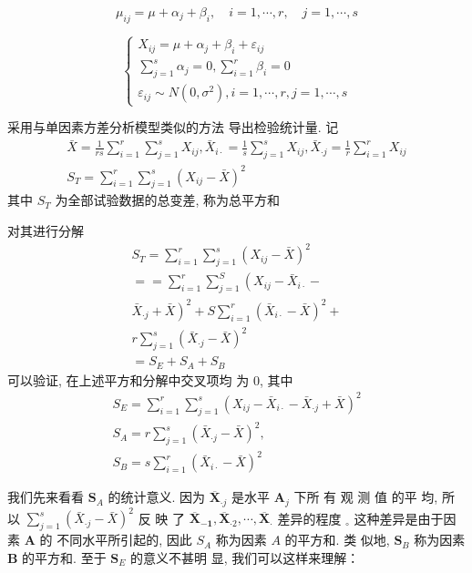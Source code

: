 $$
\mu_{i j}=\mu+\alpha_{j}+\beta_{i}, \quad i=1, \cdots, r, \quad j=1, \cdots, s
$$

$$ \left\{\begin{array}{l}X_{i j}=\mu+\alpha_{j}+\beta_{i}+\varepsilon_{i j} \\ \sum_{j=1}^{s} \alpha_{j}=0, \sum_{i=1}^{r} \beta_{i}=0 \\ \varepsilon_{i j} \sim N\left(0, \sigma^{2}\right), i=1, \cdots, r, j=1, \cdots, s\end{array}\right. $$

采用与单因素方差分析模型类似的方法 导出检验统计量. 
记
$$
\begin{array}{c}
\bar{X}=\frac{1}{r s} \sum_{i=1}^{r} \sum_{j=1}^{s} X_{i j}, \bar{X}_{i \cdot}=\frac{1}{s} \sum_{j=1}^{s} X_{i j}, \bar{X}_{\cdot j}=\frac{1}{r} \sum_{i=1}^{r} X_{i j} \\
S_{T}=\sum_{i=1}^{r} \sum_{j=1}^{s}\left(X_{i j}-\bar{X}\right)^{2}
\end{array}
$$
其中 \( S_{T} \) 为全部试验数据的总变差, 称为总平方和

对其进行分解
$$
\begin{array}{c}
S_{T}=\sum_{i=1}^{r} \sum_{j=1}^{s}\left(X_{i j}-\bar{X}\right)^{2} \\
==\sum_{i=1}^{r} \sum_{j=1}^{S}\left(X_{i j}-\bar{X}_{i \cdot}-\right. \\
\left.\bar{X}_{\cdot j}+\bar{X}\right)^{2}+S \sum_{i=1}^{r}\left(\bar{X}_{i \cdot}-\bar{X}\right)^{2}+ \\
r \sum_{j=1}^{s}\left(\bar{X}_{\cdot j}-\bar{X}\right)^{2} \\
=S_{E}+S_{A}+S_{B}
\end{array}
$$
可以验证, 在上述平方和分解中交叉项均
为 0, 其中
$$
\begin{array}{c}
S_{E}=\sum_{i=1}^{r} \sum_{j=1}^{s}\left(X_{i j}-\bar{X}_{i \cdot}-\bar{X}_{\cdot j}+\bar{X}\right)^{2} \\
S_{A}=r \sum_{j=1}^{s}\left(\bar{X}_{\cdot j}-\bar{X}\right)^{2}, \\
S_{B}= s \sum_{i=1}^{r}\left(\bar{X}_{i \cdot}-\bar{X}\right)^{2}
\end{array}
$$

我们先来看看 \( \boldsymbol{S}_{A} \) 的统计意义. 因为 \( \overline{\boldsymbol{X}}_{\mathbf{\cdot} j} \) 是水平 \( \boldsymbol{A}_{j} \) 下所
有 观 测 值 的平 均,  所 以 \( \sum_{j=1}^{s}\left(\bar{X}_{\cdot j}-\bar{X}\right)^{2} \) 反 映 了
\( \overline{\boldsymbol{X}}_{\mathbf{- 1}}, \overline{\boldsymbol{X}}_{\cdot 2}, \cdots, \overline{\boldsymbol{X}}_{\boldsymbol{\cdot}} \) 差异的程度 \( _{\circ} \) 这种差异是由于因素 \( \boldsymbol{A} \) 的
不同水平所引起的, 因此 \( S_{A} \) 称为因素 \( A \) 的平方和. 类
似地,  \( \boldsymbol{S}_{B} \) 称为因素 \( \boldsymbol{B} \) 的平方和. 至于 \( \boldsymbol{S}_{E} \) 的意义不甚明
显, 我们可以这样来理解：

